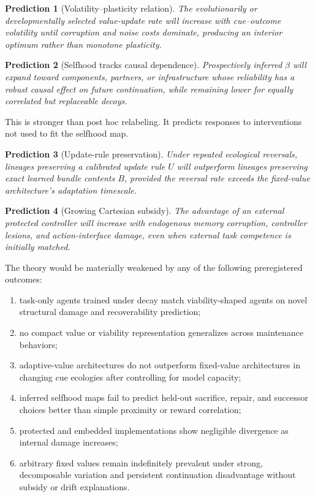\documentclass[11pt]{article}
\newtheorem{prediction}{Prediction}
\begin{document}
\begin{prediction}[Volatility--plasticity relation]
The evolutionarily or developmentally selected value-update rate will increase with cue--outcome volatility until corruption and noise costs dominate, producing an interior optimum rather than monotone plasticity.
\end{prediction}

\begin{prediction}[Selfhood tracks causal dependence]
Prospectively inferred $\beta$ will expand toward components, partners, or infrastructure whose reliability has a robust causal effect on future continuation, while remaining lower for equally correlated but replaceable decoys.
\end{prediction}

This is stronger than post hoc relabeling. It predicts responses to interventions not used to fit the selfhood map.

\begin{prediction}[Update-rule preservation]
Under repeated ecological reversals, lineages preserving a calibrated update rule $U$ will outperform lineages preserving exact learned bundle contents $B$, provided the reversal rate exceeds the fixed-value architecture's adaptation timescale.
\end{prediction}

\begin{prediction}[Growing Cartesian subsidy]
The advantage of an external protected controller will increase with endogenous memory corruption, controller lesions, and action-interface damage, even when external task competence is initially matched.
\end{prediction}

The theory would be materially weakened by any of the following preregistered outcomes:
\begin{enumerate}
\item task-only agents trained under decay match viability-shaped agents on novel structural damage and recoverability prediction;
\item no compact value or viability representation generalizes across maintenance behaviors;
\item adaptive-value architectures do not outperform fixed-value architectures in changing cue ecologies after controlling for model capacity;
\item inferred selfhood maps fail to predict held-out sacrifice, repair, and successor choices better than simple proximity or reward correlation;
\item protected and embedded implementations show negligible divergence as internal damage increases;
\item arbitrary fixed values remain indefinitely prevalent under strong, decomposable variation and persistent continuation disadvantage without subsidy or drift explanations.
\end{enumerate}
\end{document}

